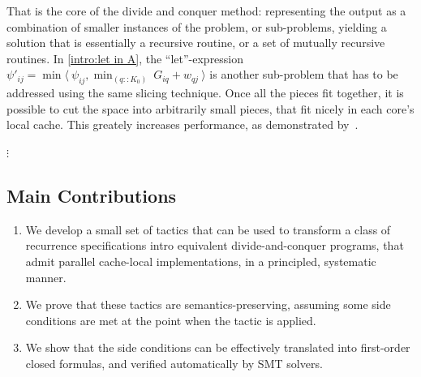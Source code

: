 That is the core of the divide and conquer method: representing the output as a combination
of smaller instances of the problem, or sub-problems, yielding a solution that is essentially
a recursive routine, or a set of mutually recursive routines. In \eqref{intro:let in A}, the
``let''-expression $\psi'_{ij} = \min \langle~\psi_{ij}, \min_{(q::K_0)} ~ G_{iq} + w_{qj}~\rangle$
is another sub-problem that has to be addressed using the same slicing technique.
Once all the pieces fit together, it is possible to cut the space into arbitrarily small pieces,
that fit nicely in each core's local cache. This greately increases performance, as demonstrated
by~. 

\begin{center}$\vdots$
\end{center}

\subsection{Main Contributions}

\begin{enumerate}
  \item We develop a small set of tactics that can be used to transform a class of recurrence
  specifications intro equivalent divide-and-conquer programs, that admit parallel cache-local
  implementations, in a principled, systematic manner.
  \item We prove that these tactics are semantics-preserving, assuming some side conditions are met
  at the point when the tactic is applied.
  \item We show that the side conditions can be effectively translated into first-order closed
  formulas, and verified automatically by SMT solvers.
\end{enumerate}

